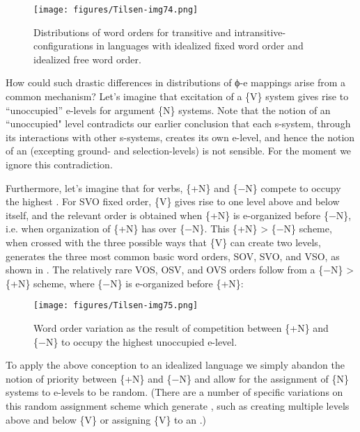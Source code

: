   
\begin{figure}
\texttt{[image: figures/Tilsen-img74.png]}
\caption{Distributions of word orders for transitive and intransitive-configurations in languages with idealized fixed word order and idealized free word order.}
\label{fig:4:24}
\end{figure}
 

  How could such drastic differences in distributions of ϕ{}-e mappings arise from a common mechanism? Let's imagine that excitation of a \{V\} system gives rise to “unoccupied” e-levels for argument \{N\} systems. Note that the notion of an “unoccupied" level contradicts our earlier conclusion that each s-system, through its interactions with other s-systems, creates its own e-level, and hence the notion of an  (excepting ground- and selection-levels) is not sensible. For the moment we ignore this contradiction.

  Furthermore, let's imagine that for  verbs, \{+N\} and \{−N\} compete to occupy the highest . For SVO fixed order, \{V\} gives rise to one level above and below itself, and the relevant order is obtained when \{+N\} is e-organized before \{−N\}, i.e. when organization of \{+N\} has  over \{−N\}. This \{+N\} > \{−N\} scheme, when crossed with the three possible ways that \{V\} can create two levels, generates the three most common basic word orders, SOV, SVO, and VSO, as shown in {}. The relatively rare VOS, OSV, and OVS orders follow from a \{−N\} > \{+N\} scheme, where \{−N\} is e-organized before \{+N\}:

  
\begin{figure}
\texttt{[image: figures/Tilsen-img75.png]}
\caption{Word order variation as the result of competition between \{+N\} and \{−N\} to occupy the highest unoccupied e-level.}
\label{fig:4:25}
\end{figure}
 

  To apply the above conception to an idealized  language we simply abandon the notion of priority between \{+N\} and \{−N\} and allow for the assignment of \{N\} systems to e-levels to be random. (There are a number of specific variations on this random assignment scheme which generate , such as creating multiple levels above and below \{V\} or assigning \{V\} to an .)

